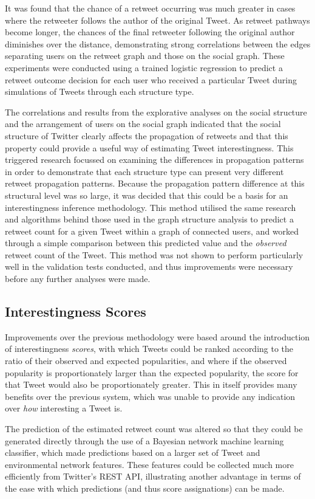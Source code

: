 It was found that the chance of a retweet occurring was much greater in cases where the retweeter follows the author of the original Tweet. As retweet pathways become longer, the chances of the final retweeter following the original author diminishes over the distance, demonstrating strong correlations between the edges separating users on the retweet graph and those on the social graph. These experiments were conducted using a trained logistic regression to predict a retweet outcome decision for each user who received a particular Tweet during simulations of Tweets through each structure type.

The correlations and results from the explorative analyses on the social structure and the arrangement of users on the social graph indicated that the social structure of Twitter clearly affects the propagation of retweets and that this property could provide a useful way of estimating Tweet interestingness. This triggered research focussed on examining the differences in propagation patterns in order to demonstrate that each structure type can present very different retweet propagation patterns. Because the propagation pattern difference at this structural level was so large, it was decided that this could be a basis for an interestingness inference methodology. This method utilised the same research and algorithms behind those used in the graph structure analysis to predict a retweet count for a given Tweet within a graph of connected users, and worked through a simple comparison between this predicted value and the \textit{observed} retweet count of the Tweet. This method was not shown to perform particularly well in the validation tests conducted, and thus improvements were necessary before any further analyses were made.


\subsection{Interestingness Scores}
Improvements over the previous methodology were based around the introduction of interestingness \textit{scores}, with which Tweets could be ranked according to the ratio of their observed and expected popularities, and where if the observed popularity is proportionately larger than the expected popularity, the score for that Tweet would also be proportionately greater. This in itself provides many benefits over the previous system, which was unable to provide any indication over \textit{how} interesting a Tweet is.

The prediction of the estimated retweet count was altered so that they could be generated directly through the use of a Bayesian network machine learning classifier, which made predictions based on a larger set of Tweet and environmental network features. These features could be collected much more efficiently from Twitter's REST API, illustrating another advantage in terms of the ease with which predictions (and thus score assignations) can be made. 

